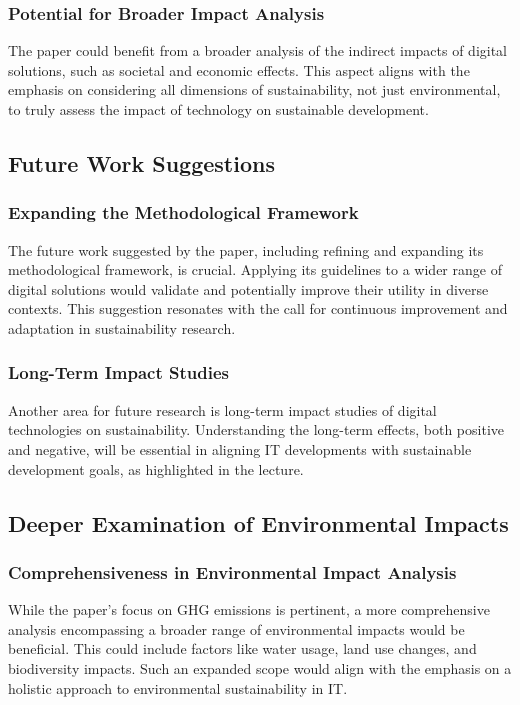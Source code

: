 \documentclass[conference,compsoc]{IEEEtran}
\begin{document}
\subsubsection{Potential for Broader Impact Analysis}

The paper could benefit from a broader analysis of the indirect impacts of digital solutions, such as societal and economic effects. This aspect aligns with the  emphasis on considering all dimensions of sustainability, not just environmental, to truly assess the impact of technology on sustainable development.

\subsection{Future Work Suggestions}

\subsubsection{Expanding the Methodological Framework}

The future work suggested by the paper, including refining and expanding its methodological framework, is crucial. Applying its guidelines to a wider range of digital solutions would validate and potentially improve their utility in diverse contexts. This suggestion resonates with the  call for continuous improvement and adaptation in sustainability research.

\subsubsection{Long-Term Impact Studies}

Another area for future research is long-term impact studies of digital technologies on sustainability. Understanding the long-term effects, both positive and negative, will be essential in aligning IT developments with sustainable development goals, as highlighted in the lecture.

\subsection{Deeper Examination of Environmental Impacts}

\subsubsection{Comprehensiveness in Environmental Impact Analysis}

While the paper's focus on GHG emissions is pertinent, a more comprehensive analysis encompassing a broader range of environmental impacts would be beneficial. This could include factors like water usage, land use changes, and biodiversity impacts. Such an expanded scope would align with the  emphasis on a holistic approach to environmental sustainability in IT.
\end{document}
